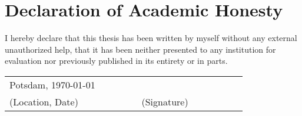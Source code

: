 
\pagestyle{plain}

\chapter*{Declaration of Academic Honesty}

I hereby declare that this thesis has been written by myself without any
external unauthorized help, that it has been neither presented to any
institution for evaluation nor previously published in its entirety or in parts.

\vspace{1.5cm}

\noindent
\begin{tabular}{p{0.4\linewidth}p{0.1\linewidth}p{0.4\linewidth}}
{\Large Potsdam, \today}&&\\
\cline{1-1}
\cline{3-3}
(Location, Date)&&(Signature)
\end{tabular}
